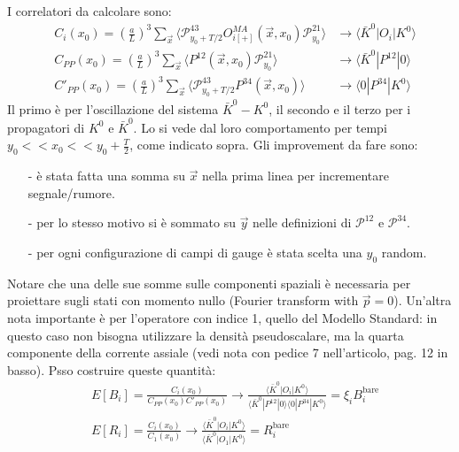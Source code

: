 \documentclass[12pt,a4paper,openright]{article}
\newcommand{\la}{\langle}
\newcommand{\ra}{\rangle}
\newcommand{\colg}{\textcolor{PineGreen}}
\begin{document}
I correlatori da calcolare sono:
\begin{equation*}
  \begin{aligned}
    & C_i(x_0) = \left(\frac{a}{L}\right)^3 \sum_{\vec{x}} \la \mathcal{P}^{43}_{y_0+T/2} O_{i[+]}^{MA} (\vec x, x_0) \mathcal{P}^{21}_{y_0} \ra & \longrightarrow \la \bar K^0 | O_i | K^0 \ra \\
    & C_{PP}(x_0) = \left(\frac{a}{L}\right)^3 \sum_{\vec{x}} \la P^{12} (\vec x, x_0) \mathcal{P}^{21}_{y_0} \ra & \longrightarrow \la \bar K^0 | P^{12} | 0 \ra \\
    & C'_{PP}(x_0) = \left(\frac{a}{L}\right)^3 \sum_{\vec{x}} \la \mathcal{P}^{43}_{y_0+T/2} P^{34}(\vec x, x_0) \ra & \longrightarrow \la 0 | P^{34} | K^0 \ra
  \end{aligned}
\end{equation*}
Il primo è per l'oscillazione del sistema $\bar K^0 - K^0$, il secondo e il terzo per i propagatori di $K^0$ e $\bar K^0$. 
Lo si vede dal loro comportamento per tempi $y_0 << x_0 << y_0 + \frac{T}{2}$, come indicato sopra.
\newline
Gli improvement da fare sono:
\begin{itemize}
  \item [-] è stata fatta una somma su $\vec x$ nella prima linea per incrementare segnale/rumore.
  \item [-] per lo stesso motivo si è sommato su $\vec y$ nelle definizioni di $\mathcal{P}^{12}$ e $\mathcal{P}^{34}$.
  \item [-] per ogni configurazione di campi di gauge è stata scelta una $y_0$ random.
\end{itemize}
Notare che una delle sue somme sulle componenti spaziali è \colg{necessaria per proiettare sugli stati con momento nullo (Fourier transform with $\vec p = 0$)}.
Un'altra nota importante è per l'operatore con indice 1, quello del Modello Standard: in questo caso non bisogna utilizzare la densità pseudoscalare, ma la quarta componente della corrente assiale (vedi nota con pedice 7 nell'articolo, pag. 12 in basso).
\newline
Psso costruire queste quantità:
\begin{equation*}
  \begin{aligned}
    & E[B_i] = \frac{C_i(x_0)}{C_{PP}(x_0)C'_{PP}(x_0)} \longrightarrow \frac{\la \bar K^0 | O_i | K^0 \ra}{\la \bar K^0 | P^{12} | 0 \ra \la 0 | P^{34} | K^0 \ra} = \xi_i B_i^{\text{bare}} \\
    & E[R_i] = \frac{C_i(x_0)}{C_1(x_0)} \longrightarrow \frac{\la \bar K^0 | O_i | K^0 \ra}{\la \bar K^0 | O_1 | K^0 \ra} = R_i^{\text{bare}}
  \end{aligned}
\end{equation*}
\end{document}
